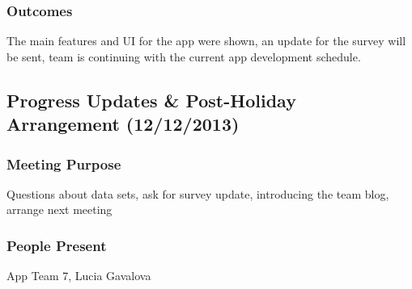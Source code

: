 \documentclass[12pt,a4paper,oneside,titlepage]{article}
\begin{document}
\subsubsection{Outcomes} 
The main features and UI for the app were shown, an update for the survey will be sent, team is continuing with the current app development schedule.

\subsection{Progress Updates \& Post-Holiday Arrangement (12/12/2013)}

\subsubsection{Meeting Purpose}
Questions about data sets, ask for survey update, introducing the team blog, arrange next meeting

\subsubsection{People Present}
App Team 7, Lucia Gavalova
\end{document}
